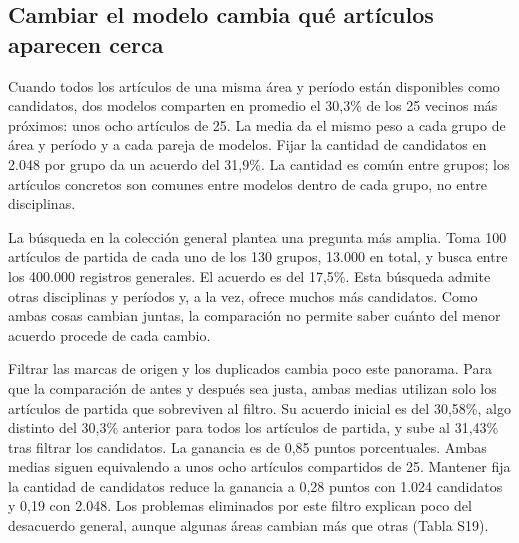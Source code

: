 \documentclass[12pt]{article}
\begin{document}
\FloatBarrier
\subsection{Cambiar el modelo cambia qué artículos aparecen cerca}
Cuando todos los artículos de una misma área y período están disponibles como candidatos, dos modelos comparten en promedio el 30,3\% de los 25 vecinos más próximos: unos ocho artículos de 25. La media da el mismo peso a cada grupo de área y período y a cada pareja de modelos. Fijar la cantidad de candidatos en 2.048 por grupo da un acuerdo del 31,9\%. La cantidad es común entre grupos; los artículos concretos son comunes entre modelos dentro de cada grupo, no entre disciplinas.

La búsqueda en la colección general plantea una pregunta más amplia. Toma 100 artículos de partida de cada uno de los 130 grupos, 13.000 en total, y busca entre los 400.000 registros generales. El acuerdo es del 17,5\%. Esta búsqueda admite otras disciplinas y períodos y, a la vez, ofrece muchos más candidatos. Como ambas cosas cambian juntas, la comparación no permite saber cuánto del menor acuerdo procede de cada cambio.

Filtrar las marcas de origen y los duplicados cambia poco este panorama. Para que la comparación de antes y después sea justa, ambas medias utilizan solo los artículos de partida que sobreviven al filtro. Su acuerdo inicial es del 30,58\%, algo distinto del 30,3\% anterior para todos los artículos de partida, y sube al 31,43\% tras filtrar los candidatos. La ganancia es de 0,85 puntos porcentuales. Ambas medias siguen equivalendo a unos ocho artículos compartidos de 25. Mantener fija la cantidad de candidatos reduce la ganancia a 0,28 puntos con 1.024 candidatos y 0,19 con 2.048. Los problemas eliminados por este filtro explican poco del desacuerdo general, aunque algunas áreas cambian más que otras (Tabla S19).
\end{document}
